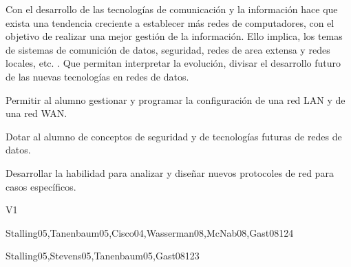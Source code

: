 \begin{syllabus}


\begin{justification}
   Con el desarrollo de las tecnologías de comunicación   y la información
    hace que exista una tendencia creciente a  establecer  más redes de
    computadores,  con el objetivo de realizar una mejor gestión de la
    información.  Ello implica, los temas de sistemas de comunición de  datos,
     seguridad, redes de area extensa  y redes  locales, etc.  . Que permitan
     interpretar la  evolución, divisar  el desarrollo  futuro de las
     nuevas  tecnologías en redes de datos.
   \end{justification}
   
   \begin{goals}
   \item Permitir al alumno gestionar y programar la configuración de una red LAN y de una red WAN.
   \item Dotar al alumno de conceptos de seguridad y de tecnologías futuras de redes de datos.
   \item Desarrollar la habilidad para analizar y diseñar nuevos protocoles de red para casos específicos.
   \end{goals}
   
   \begin{outcomes}{V1}
      \item {}
      \item {}
      \item {}
      \item {}
      \item {}
      \item {}
   \end{outcomes}
   
   \begin{unit}{\NCIntroduction}{}{Stalling05,Tanenbaum05,Cisco04,Wasserman08,McNab08,Gast08}{12}{4}
      \NCIntroductionAllTopics
      \NCIntroductionAllLearningOutcomes
   \end{unit}
   
   \begin{unit}{\NCNetworkedApplications}{}{Stalling05,Stevens05,Tanenbaum05,Gast08}{12}{3}
      \NCNetworkedApplicationsAllTopics
      \NCNetworkedApplicationsAllLearningOutcomes
   \end{unit}
   

\end{syllabus}
